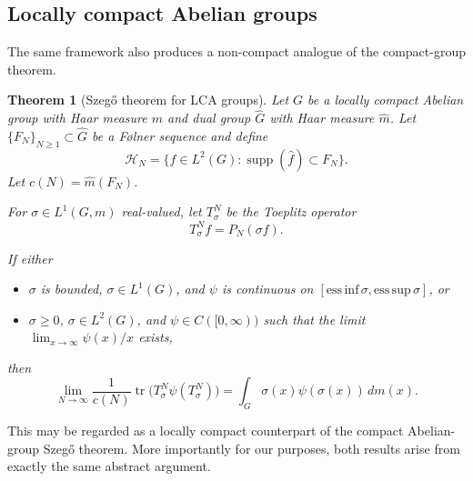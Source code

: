 \documentclass{amsart}
\newtheorem{thm}{Theorem}[section]
\theoremstyle{definition}
\theoremstyle{remark}
\numberwithin{equation}{section}
\begin{document}
\subsection{Locally compact Abelian groups}

The same framework also produces a non-compact analogue of the compact-group theorem.

\begin{thm}[Szeg\H{o} theorem for LCA groups]\label{thm:szego_lca}
Let $G$ be a locally compact Abelian group with Haar measure $m$
and dual group $\widehat{G}$ with Haar measure $\widehat{m}$.
Let $\{F_N\}_{N\ge1}\subset \widehat{G}$ be a F\o lner sequence and define
\[
\mathcal{H}_N
=
\{f\in L^2(G): \operatorname{supp}(\widehat{f})\subset F_N\}.
\]
Let $c(N)=\widehat{m}(F_N)$.

For $\sigma\in L^1(G,m)$ real-valued,
let $T_\sigma^N$ be the Toeplitz operator
\[
T_\sigma^N f = P_N(\sigma f).
\]

If either

\begin{itemize}
\item[(a)] $\sigma$ is bounded, $\sigma\in L^{1}(G)$, and
$\psi$ is continuous on
$[\mathrm{ess\,inf}\,\sigma,\mathrm{ess\,sup}\,\sigma]$, or
\item[(b)] $\sigma\ge0$, $\sigma\in L^{2}(G)$, and
$\psi\in C([0,\infty))$ such that the limit
$\lim_{x\to\infty}\psi(x)/x$ exists,
\end{itemize}

then
\[
\lim_{N\to\infty}
\frac{1}{c(N)}
\operatorname{tr}\!\big(
T_\sigma^N \psi(T_\sigma^N)
\big)
=
\int_G \sigma(x)\psi(\sigma(x))\, dm(x).
\]
\end{thm}

This may be regarded as a locally compact counterpart of the compact Abelian-group Szeg\H{o} theorem. More importantly for our purposes, both results arise from exactly the same abstract argument.
\end{document}

